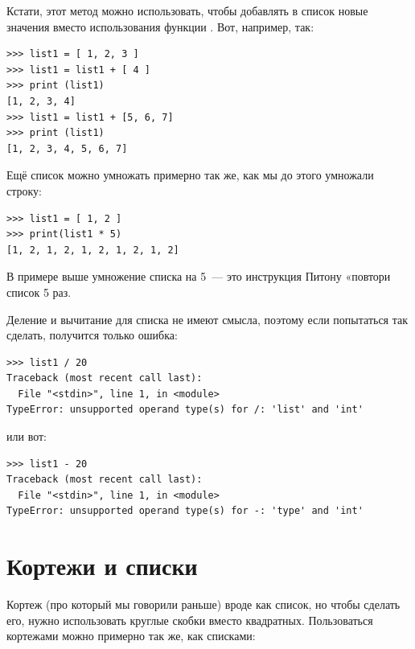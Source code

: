 Кстати, этот метод можно использовать, чтобы добавлять в список новые значения вместо использования функции . Вот, например, так:

\begin{listing}
\begin{verbatim}
>>> list1 = [ 1, 2, 3 ]
>>> list1 = list1 + [ 4 ]
>>> print (list1)
[1, 2, 3, 4]
>>> list1 = list1 + [5, 6, 7]
>>> print (list1)
[1, 2, 3, 4, 5, 6, 7]
\end{verbatim}
\end{listing}

Ещё список можно умножать примерно так же, как мы до этого умножали строку:

\begin{listing}
\begin{verbatim}
>>> list1 = [ 1, 2 ]
>>> print(list1 * 5)
[1, 2, 1, 2, 1, 2, 1, 2, 1, 2]
\end{verbatim}
\end{listing}

В примере выше умножение списка на 5 — это инструкция Питону «повтори список 5 раз.

Деление и вычитание для списка не имеют смысла, поэтому если попытаться так сделать, получится только ошибка:

\begin{listing}
\begin{verbatim}
>>> list1 / 20
Traceback (most recent call last):
  File "<stdin>", line 1, in <module>
TypeError: unsupported operand type(s) for /: 'list' and 'int'
\end{verbatim}
\end{listing}

или вот:

\begin{listing}
\begin{verbatim}
>>> list1 - 20
Traceback (most recent call last):
  File "<stdin>", line 1, in <module>
TypeError: unsupported operand type(s) for -: 'type' and 'int'
\end{verbatim}
\end{listing}


\section{Кортежи и списки}\label{tuplesandlists}

Кортеж (про который мы говорили раньше) вроде как список, но чтобы сделать его, нужно использовать круглые скобки вместо квадратных. Пользоваться кортежами можно примерно так же, как списками:

